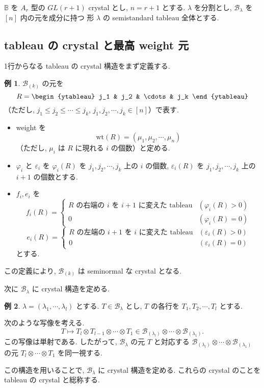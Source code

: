 \documentclass[
  a4paper, 
  12pt,
  ja=standard,
  xelatex,
  left=30truemm,
  right=30truemm,
  titlepage 
]{bxjsarticle}
\theoremstyle{definition}
\newtheorem*{ex}{例}
\begin{document}
$\mathbb{B}$ を $A_r$ 型の $GL(r + 1)$ crystal とし, $n = r + 1$ とする.
$\lambda$ を分割とし, $\mathcal{B}_{\lambda}$ を $[n]$ 内の元を成分に持つ
形 $\lambda$ の semistandard tableau 全体とする.


\subsection{tableau の crystal と最高 weight 元}
1行からなる tableau の crystal 構造をまず定義する.

\begin{ex}
  $\mathcal{B}_{(k)}$ の元を 
  \[
  R = \begin{ytableau} j_1 & j_2 & \cdots & j_k \end{ytableau}
  \]
  （ただし, $j_1 \leq j_2 \leq \cdots \leq j_k$, $j_1, j_2, \cdots, j_k \in [n]$）で表す.

  \begin{itemize}
    \item weight を
    \[
    \mathrm{wt}(R) = (\mu_1, \mu_2, \cdots, \mu_n)
    \]
    （ただし, $\mu_i$ は $R$ に現れる $i$ の個数）と定める.

    \item $\varphi_i$ と $\varepsilon_i$ を
    $\varphi_i(R)$ を $j_1, j_2, \cdots, j_k$ 上の $i$ の個数, $\varepsilon_i(R)$ を $j_1, j_2, \cdots, j_k$ 上の $i+1$ の個数とする.
    
    \item $f_i, e_i$ を
    \[
    f_i(R) = 
    \begin{cases} 
      \text{$R$ の右端の $i$ を $i+1$ に変えた tableau} & (\varphi_i(R) > 0) \\
      0 & (\varphi_i(R) = 0)
    \end{cases}
    \]
    \[
    e_i(R) = 
    \begin{cases} 
      \text{$R$ の左端の $i+1$ を $i$ に変えた tableau} & (\varepsilon_i(R) > 0) \\
      0 & (\varepsilon_i(R) = 0)
    \end{cases}
    \]
    とする.
  \end{itemize}

  この定義により, $\mathcal{B}_{(k)}$ は seminormal な crystal となる.
\end{ex}

次に $\mathcal{B}_{\lambda}$ に crystal 構造を定める.

\begin{ex}
  $\lambda = (\lambda_1, \cdots, \lambda_l)$ とする.  
  $T \in \mathcal{B}_{\lambda}$ とし, $T$ の各行を $T_1, T_2, \cdots, T_l$ とする.  

  次のような写像を考える.
  \[
  T \mapsto T_l \otimes T_{l - 1 } \otimes \cdots \otimes T_1 \in \mathcal{B}_{(\lambda_l)} \otimes \cdots \otimes \mathcal{B}_{(\lambda_1)}.
  \]
  この写像は単射である.
  したがって, $\mathcal{B}_{\lambda}$ の元 $T$ と対応する $\mathcal{B}_{(\lambda_l)} \otimes \cdots \otimes \mathcal{B}_{(\lambda_1)}$
  の元 $T_l \otimes \cdots \otimes T_1$ を同一視する.

  この構造を用いることで, $\mathcal{B}_{\lambda}$ に crystal 構造を定める. これらの crystal のことを tableau の crystal と総称する.
\end{ex}
\end{document}
